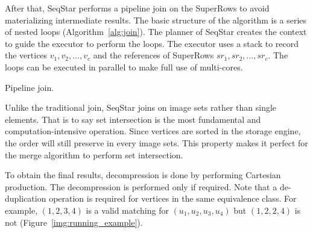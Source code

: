 After that, SeqStar performs a pipeline join on the SuperRows to avoid materializing intermediate results.
The basic structure of the algorithm is a series of nested loops (Algorithm~\ref{alg:join}).
The planner of SeqStar creates the context to guide the executor to perform the loops.
The executor uses a stack to record the vertices $v_1, v_2, \dots, v_c$ and the references of SuperRows $sr_1, sr_2, \dots, sr_c$.
The loops can be executed in parallel to make full use of multi-cores.

\begin{algorithm}[ht]
  \caption{Pipeline join.}\label{alg:join}
\end{algorithm}

Unlike the traditional join, SeqStar joins on image sets rather than single elements.
That is to say set intersection is the most fundamental and computation-intensive operation.
Since vertices are sorted in the storage engine,
the order will still preserve in every image sets.
This property makes it perfect for the merge algorithm to perform set intersection.

To obtain the final results, decompression is done by performing Cartesian production.
The decompression is performed only if required.
Note that a de-duplication operation is required for vertices in the same equivalence class.
For example, $(1, 2, 3, 4)$ is a valid matching for $(u_1, u_2, u_3, u_4)$ but $(1, 2, 2, 4)$ is not (Figure~\ref{img:running_example}).


